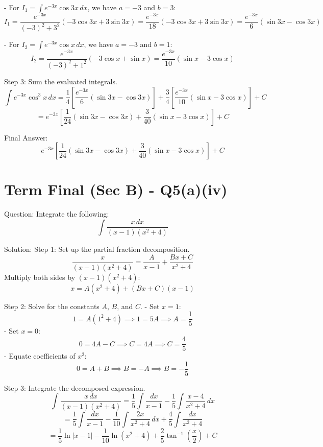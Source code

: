 \documentclass{article}
\begin{document}
- For \(I_1 = \int e^{-3x} \cos 3x \, dx\), we have \(a = -3\) and \(b = 3\):
  \[
  I_1 = \frac{e^{-3x}}{(-3)^2 + 3^2} (-3 \cos 3x + 3 \sin 3x) = \frac{e^{-3x}}{18} (-3 \cos 3x + 3 \sin 3x) = \frac{e^{-3x}}{6} (\sin 3x - \cos 3x)
  \]

- For \(I_2 = \int e^{-3x} \cos x \, dx\), we have \(a = -3\) and \(b = 1\):
  \[
  I_2 = \frac{e^{-3x}}{(-3)^2 + 1^2} (-3 \cos x + \sin x) = \frac{e^{-3x}}{10} (\sin x - 3 \cos x)
  \]

Step 3: Sum the evaluated integrals.
\[
\int e^{-3x} \cos^3 x \, dx = \frac{1}{4} \left[ \frac{e^{-3x}}{6} (\sin 3x - \cos 3x) \right] + \frac{3}{4} \left[ \frac{e^{-3x}}{10} (\sin x - 3 \cos x) \right] + C
\]
\[
= e^{-3x} \left[ \frac{1}{24}(\sin 3x - \cos 3x) + \frac{3}{40}(\sin x - 3 \cos x) \right] + C
\]

Final Answer:
\[
\boxed{e^{-3x} \left[ \frac{1}{24}(\sin 3x - \cos 3x) + \frac{3}{40}(\sin x - 3 \cos x) \right] + C}
\]

\section*{Term Final (Sec B) - Q5(a)(iv)}
Question:
Integrate the following:
\[
\int \frac{x \, dx}{(x-1)(x^2+4)}
\]

Solution:
Step 1: Set up the partial fraction decomposition.
\[
\frac{x}{(x-1)(x^2+4)} = \frac{A}{x-1} + \frac{Bx+C}{x^2+4}
\]
Multiply both sides by \((x-1)(x^2+4)\):
\[
x = A(x^2+4) + (Bx+C)(x-1)
\]

Step 2: Solve for the constants \(A\), \(B\), and \(C\).
- Set \(x = 1\):
  \[
  1 = A(1^2+4) \implies 1 = 5A \implies A = \frac{1}{5}
  \]
- Set \(x = 0\):
  \[
  0 = 4A - C \implies C = 4A \implies C = \frac{4}{5}
  \]
- Equate coefficients of \(x^2\):
  \[
  0 = A + B \implies B = -A \implies B = -\frac{1}{5}
  \]

Step 3: Integrate the decomposed expression.
\[
\int \frac{x \, dx}{(x-1)(x^2+4)} = \frac{1}{5} \int \frac{dx}{x-1} - \frac{1}{5} \int \frac{x-4}{x^2+4} \, dx
\]
\[
= \frac{1}{5} \int \frac{dx}{x-1} - \frac{1}{10} \int \frac{2x}{x^2+4} \, dx + \frac{4}{5} \int \frac{dx}{x^2+4}
\]
\[
= \frac{1}{5} \ln|x-1| - \frac{1}{10} \ln(x^2+4) + \frac{2}{5} \tan^{-1}\left(\frac{x}{2}\right) + C
\]
\end{document}

